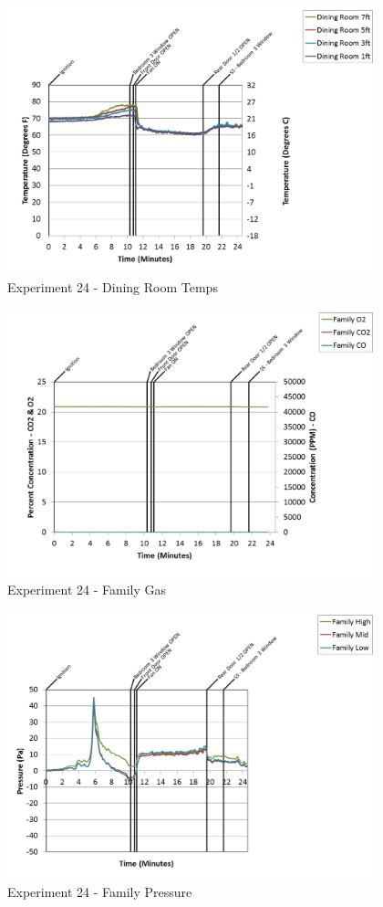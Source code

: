 \documentclass{article}
\begin{document}
\begin{appendices}
\begin{figure}[h!]
	\centering
	\includegraphics[height=3.05in]{0_Images/Results_Charts/Exp_24_Charts/DiningRoomTemps.png}
	\caption{Experiment 24 - Dining Room Temps}
\end{figure}

\clearpage

\begin{figure}[h!]
	\centering
	\includegraphics[height=3.05in]{0_Images/Results_Charts/Exp_24_Charts/FamilyGas.png}
	\caption{Experiment 24 - Family Gas}
\end{figure}


\begin{figure}[h!]
	\centering
	\includegraphics[height=3.05in]{0_Images/Results_Charts/Exp_24_Charts/FamilyPressure.png}
	\caption{Experiment 24 - Family Pressure}
\end{figure}


\end{appendices}
\end{document}

